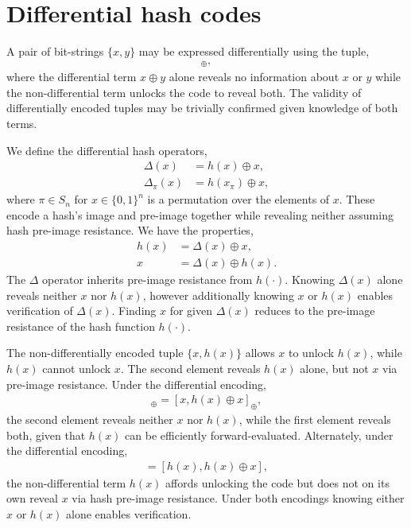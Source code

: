 \documentclass[twocolumn, aps, amsmath, amssymb, nofootinbib, superscriptaddress, longbibliography, doublefloatfix, table-of-contents, eqsecnum, rmp]{revtex4-2}
\begin{document}
\section{Differential hash codes}

A pair of bit-strings $\{x,y\}$ may be expressed differentially using the tuple,
\begin{align}
	[x,x\oplus y]_\oplus,
\end{align}
where the differential term $x\oplus y$ alone reveals no information about $x$ or $y$ while the non-differential term unlocks the code to reveal both. The validity of differentially encoded tuples may be trivially confirmed given knowledge of both terms.

We define the differential hash operators,
\begin{align}
	\Delta(x) &= h(x)\oplus x,\nonumber\\
	\Delta_\pi(x) &= h(x_\pi)\oplus x,
\end{align}
where $\pi\in S_n$ for $x\in\{0,1\}^n$ is a permutation over the elements of $x$. These encode a hash's image and pre-image together while revealing neither assuming hash pre-image resistance. We have the properties,
\begin{align}
	h(x) &= \Delta(x) \oplus x,\nonumber\\
	x &= \Delta(x) \oplus h(x).
\end{align}
The $\Delta$ operator inherits pre-image resistance from $h(\cdot)$. Knowing $\Delta(x)$ alone reveals neither $x$ nor $h(x)$, however additionally knowing $x$ or $h(x)$ enables verification of $\Delta(x)$. Finding $x$ for given $\Delta(x)$ reduces to the pre-image resistance of the hash function $h(\cdot)$.

The non-differentially encoded tuple $\{x,h(x)\}$ allows $x$ to unlock $h(x)$, while $h(x)$ cannot unlock $x$. The second element reveals $h(x)$ alone, but not $x$ via pre-image resistance. Under the differential encoding,
\begin{align}
	[x,\Delta(x)]_\oplus =[x,h(x)\oplus x]_\oplus,
\end{align}
the second element reveals neither $x$ nor $h(x)$, while the first element reveals both, given that $h(x)$ can be efficiently forward-evaluated. Alternately, under the differential encoding,
\begin{align}
	[h(x),\Delta(x)] = [h(x),h(x)\oplus x],
\end{align}
the non-differential term $h(x)$ affords unlocking the code but does not on its own reveal $x$ via hash pre-image resistance. Under both encodings knowing either $x$ or $h(x)$ alone enables verification.
\end{document}
